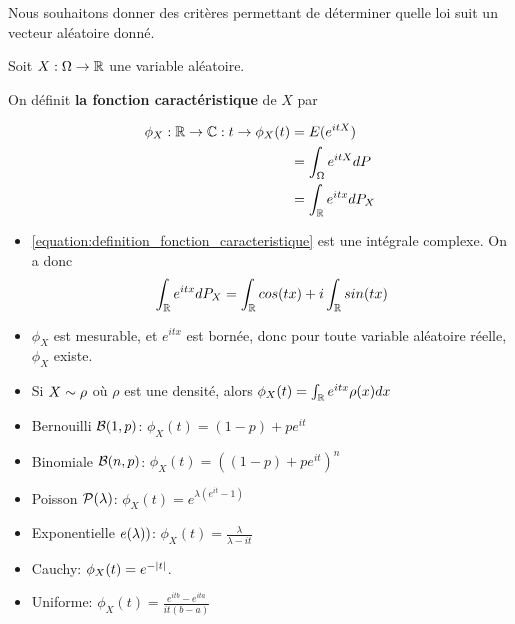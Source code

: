 Nous souhaitons donner des critères permettant de déterminer quelle loi suit un
vecteur aléatoire donné.

\begin{definition}
	Soit $X : \Omega \rightarrow \mathbb{R}$ une variable aléatoire.

	On définit \textbf{la fonction caractéristique} de $X$ par

	\begin{align}
		\phi_{X} : \mathbb{R} \rightarrow \mathbb{C} : t \rightarrow
		\phi_{X}(t) & = E(e^{i t X}) \\
		& = \int_{\Omega} e^{it X} dP \\
		& = \int_{\mathbb{R}} e^{it x} dP_{X}
		\label{equation:definition_fonction_caracteristique}
	\end{align}
\end{definition}

\begin{remarque}
	\begin{itemize}
		\item \ref{equation:definition_fonction_caracteristique} est une
			intégrale complexe. On a donc
			\begin{equation}
				\int_{\mathbb{R}}e^{itx} dP_{X} = \int_{\mathbb{R}}cos(tx) + i
				\int_{\mathbb{R}} sin(tx)
			\end{equation}
		\item $\phi_{X}$ est mesurable, et $e^{itx}$ est bornée, donc pour toute
			variable aléatoire réelle, $\phi_{X}$ existe.
		\item Si $X \sim \rho$ où $\rho$ est une densité, alors $\phi_{X}(t) = \int_{\mathbb{R}} e^{itx}
			\rho(x) dx$
	\end{itemize}
\end{remarque}

\begin{exemple}
	\begin{itemize}
		\item Bernouilli $\mathcal{B}(1, p)$: $\phi_{X}(t) = (1 - p) + p e^{it}$
		\item Binomiale $\mathcal{B}(n, p)$: $\phi_{X}(t) = ( (1 - p) + p e^{it})^{n}$
		\item Poisson $\mathcal{P}(\lambda)$: $\phi_{X}(t) = e^{\lambda (e^{it} - 1)}$
		\item Exponentielle $e(\lambda))$: $\phi_{X}(t) = \frac{\lambda}{\lambda
			- it}$
		\item Cauchy: $\phi_{X}(t) = e^{-\abs{t}}$.
		\item Uniforme: $\phi_{X}(t) = \frac{e^{itb} - e^{ita}}{it (b - a)}$
	\end{itemize}
\end{exemple}

